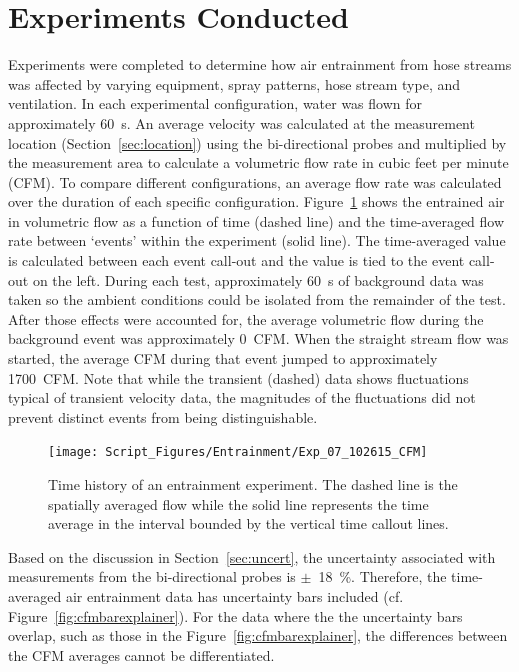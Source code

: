 \documentclass[12pt,oneside]{book}
\begin{document}
\clearpage



\section{Experiments Conducted}

Experiments were completed to determine how air entrainment from hose streams was affected by varying equipment, spray patterns, hose stream type, and ventilation. In each experimental configuration, water was flown for approximately 60~s. An average velocity was calculated at the measurement location (Section~\ref{sec:location}) using the bi-directional probes and multiplied by the measurement area to calculate a volumetric flow rate in cubic feet per minute (CFM). To compare different configurations, an average flow rate was calculated over the duration of each specific configuration. Figure~\ref{fig:cfmplotexplainer} shows the entrained air in volumetric flow as a function of time (dashed line) and the time-averaged flow rate between `events' within the experiment (solid line). The time-averaged value is calculated between each event call-out and the value is tied to the event call-out on the left. During each test, approximately 60~s of background data was taken so the ambient conditions could be isolated from the remainder of the test. After those effects were accounted for, the average volumetric flow during the background event was approximately 0~CFM. When the straight stream flow was started, the average CFM during that event jumped to approximately 1700~CFM. Note that while the transient (dashed) data shows fluctuations typical of transient velocity data, the magnitudes of the fluctuations did not prevent distinct events from being distinguishable.

\begin{figure}[!ht]
\centering
\texttt{[image: Script\_Figures/Entrainment/Exp\_07\_102615\_CFM]} 
\caption[Time History of Entrainment Experiment]{Time history of an entrainment experiment. The dashed line is the spatially averaged flow while the solid line represents the time average in the interval bounded by the vertical time callout lines.}
\label{fig:cfmplotexplainer}
\end{figure}

Based on the discussion in Section~\ref{sec:uncert}, the uncertainty associated with measurements from the bi-directional probes is $\pm$~18~\%. Therefore, the time-averaged air entrainment data has uncertainty bars included (cf. Figure~\ref{fig:cfmbarexplainer}). For the data where the the uncertainty bars overlap, such as those in the Figure~\ref{fig:cfmbarexplainer}, the differences between the CFM averages cannot be differentiated. 
\end{document}
